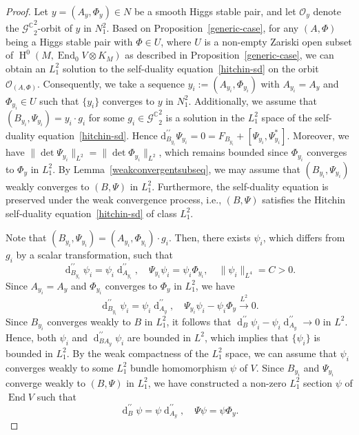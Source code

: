 \documentclass[a4paper]{amsart}
\theoremstyle{definition}
\theoremstyle{remark}
\numberwithin{equation}{section}
\begin{document}
\begin{proof}
Let $y = (A_y, \Phi_y) \in N$ be a smooth Higgs stable pair, and let $\mathcal{O}_y$ denote the ${\mathscr{G}^\mathbb{C}}_2^2$-orbit of $y$ in $N_1^2$. Based on Proposition~\ref{generic-case}, for any $(A, \Phi)$ being a Higgs stable pair with $\Phi \in U$, where $U$ is a non-empty Zariski open subset of $\operatorname{H}^{0}(M, \operatorname{End}_0 V \otimes K_M)$ as described in Proposition~\ref{generic-case}, we can obtain an $L_1^2$ solution to the self-duality equation~\eqref{hitchin-sd} on the orbit $\mathcal{O}_{(A,\Phi)}$. Consequently, we take a sequence $y_i := (A_{y_i}, \Phi_{y_i})$ with $A_{y_i} = A_y$ and $\Phi_{y_i} \in U$ such that $\{y_i\}$ converges to $y$ in $N_1^2$. Additionally, we assume that $(B_{y_i}, \Psi_{y_i}) = y_i \cdot g_i$ for some $g_i \in {\mathscr{G}^\mathbb{C}}_2^2$ is a solution in the $L_1^2$ space of the self-duality equation~\eqref{hitchin-sd}. Hence $\mathrm{d}_{B_{y_i}}^{\prime\prime} \Psi_{y_i} = 0 =  F_{B_{y_i}} + [\Psi_{y_i}, \Psi_{y_i}^*]$. Moreover, we have $\|\det \Psi_{y_i}\|_{L^2} = \|\det \Phi_{y_i}\|_{L^2}$, which remains bounded since $\Phi_{y_i}$ converges to $\Phi_y$ in $L_1^2$. By Lemma~\ref{weakconvergentsubseq}, we may assume that $(B_{y_i}, \Psi_{y_i})$ weakly converges to $(B, \Psi)$ in $L_1^2$. Furthermore, the self-duality equation is preserved under the weak convergence process, i.e., $(B, \Psi)$ satisfies the Hitchin self-duality equation~\eqref{hitchin-sd} of class $L_1^2$.

Note that $(B_{y_i}, \Psi_{y_i}) = (A_{y_i}, \Phi_{y_i}) \cdot g_i$. Then, there exists $\psi_i$, which differs from $g_i$ by a scalar transformation, such that
\[
\operatorname{d}^{\prime\prime}_{B_{y_i}} \psi_i = \psi_i \operatorname{d}^{\prime\prime}_{A_{y_i}}, \quad 
\Psi_{y_i} \psi_i = \psi_i \Phi_{y_i}, \quad 
\|\psi_i\|_{L^4} = C > 0.
\]
Since $A_{y_i} = A_y$ and $\Phi_{y_i}$ converges to $\Phi_y$ in $L_1^2$, we have  
\[
\operatorname{d}^{\prime\prime}_{B_{y_i}} \psi_i = \psi_i \operatorname{d}^{\prime\prime}_{A_y} , \quad 
\Psi_{y_i} \psi_i- \psi_i \Phi_y \xrightarrow{L^2}0.
\]
Since $B_{y_i}$ converges weakly to $B$ in $L_1^2$, it follows that $\operatorname{d}^{\prime\prime}_B \psi_i - \psi_i \operatorname{d}^{\prime\prime}_{A_y}\to 0$ in $L^2$. Hence, both $\psi_i$ and $\operatorname{d}^{\prime\prime}_{B A_y} \psi_i$ are bounded in $L^2$, which implies that $\{\psi_i\}$ is bounded in $L_1^2$. By the weak compactness of the $L_1^2$ space, we can assume that $\psi_i$ converges weakly to some $L_1^2$ bundle homomorphism $\psi$ of $V$. Since $B_{y_i}$ and $\Psi_{y_i}$ converge weakly to $(B, \Psi)$ in $L_1^2$, we have constructed a non-zero $L_1^2$ section $\psi$ of $\operatorname{End} V$ such that
\[
\operatorname{d}^{\prime\prime}_B \psi = \psi \operatorname{d}^{\prime\prime}_{A_y} , \quad 
\Psi \psi = \psi \Phi_y.
\]


\end{proof}
\end{document}
